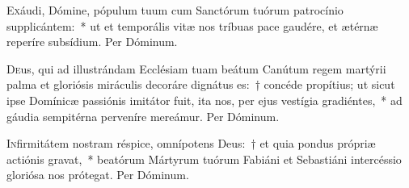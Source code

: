 \documentclass[vesperale_romanum.tex]{subfiles}
\begin{document}
\myrule


\simplex


\oratio

\lettrine{E}{x}áudi, Dómine, pópulum tuum cum Sanctórum tuórum patrocínio supplicántem:~* ut et temporális vitæ nos tríbuas pace gaudére, et ætérnæ reperíre subsídium.
Per Dóminum.


\oratio

\lettrine{D}{e}us, qui ad illustrándam Ecclésiam tuam beátum Canútum regem martýrii palma et gloriósis miráculis decoráre dignátus es:~† concéde propítius; ut  sicut ipse Domínicæ passiónis imitátor fuit, ita nos, per ejus vestígia gradiéntes,~* ad gáudia sempitérna perveníre mereámur.
Per Dóminum.

\vespsequenti

\myrule
{}

\duplexmajus

\oratio

\lettrine{I}{n}firmitátem nostram réspice, omnípotens Deus:~† et quia pondus própriæ actiónis gravat,~* beatórum Mártyrum tuórum Fabiáni et Sebastiáni intercéssio gloriósa nos prótegat.
Per Dóminum.

\capitdeseq

\myrule



\duplex


\end{document}
